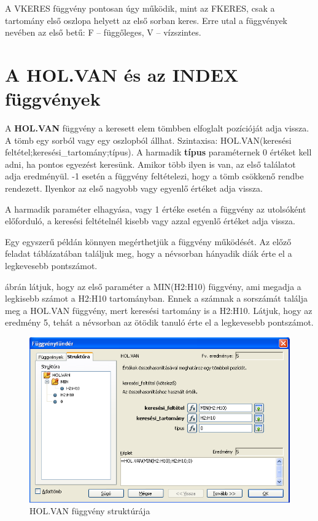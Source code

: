 A VKERES függvény pontosan úgy működik, mint az FKERES,
csak a tartomány első oszlopa helyett az első sorban keres.
Erre utal a függvények nevében az első betű: F --
függőleges, V --  vízszintes.


\section{A HOL.VAN és az INDEX függvények}

A \textbf{HOL.VAN} függvény a keresett elem tömbben elfoglalt
pozícióját adja vissza. A tömb egy sorból vagy egy
oszlopból állhat. Szintaxisa: HOL.VAN(keresési
feltétel;keresési\_tartomány;típus). A harmadik
\textbf{típus} paraméternek 0 értéket kell adni, ha pontos
egyezést keresünk. Amikor több ilyen is van, az első
találatot adja eredményül. -1 esetén a függvény
feltételezi, hogy a tömb csökkenő rendbe rendezett. Ilyenkor
az első nagyobb vagy egyenlő értéket adja vissza.

A harmadik paraméter elhagyása, vagy 1 értéke esetén a
függvény az utolsóként előforduló, a keresési
feltételnél kisebb vagy azzal egyenlő értéket adja vissza.

Egy egyszerű példán könnyen megérthetjük a függvény
működését. Az előző feladat táblázatában
 találjuk meg, hogy a névsorban hányadik diák érte el a
legkevesebb pontszámot.

 ábrán látjuk, hogy az első paraméter a MIN(H2:H10)
függvény, ami megadja a legkisebb számot a H2:H10 tartományban.
Ennek a számnak a sorszámát találja meg a HOL.VAN függvény,
mert keresési tartomány is a H2:H10. Látjuk, hogy az eredmény
5, tehát a névsorban az ötödik  tanuló érte el a
legkevesebb pontszámot.

\begin{figure}[!h]
\begin{center}
\includegraphics[width=15.999cm]{oocalcv2-img101.png}
\caption{HOL.VAN függvény struktúrája}\label{MATCHFüggvény}
\end{center}
\end{figure}

